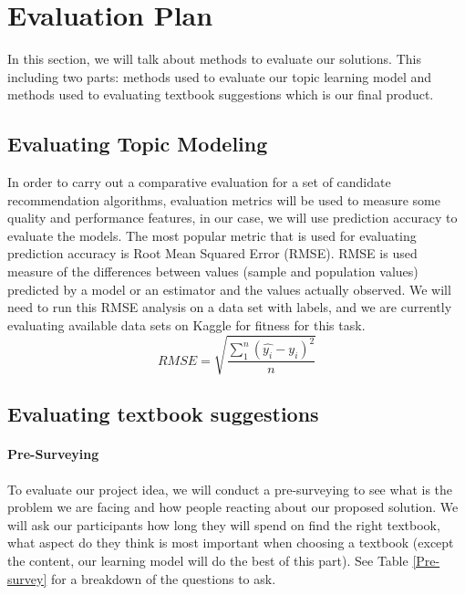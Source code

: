 
\section{Evaluation Plan}
In this section, we will talk about methods to evaluate our solutions. This including two parts: methods used to evaluate our topic learning model and methods used to evaluating textbook suggestions which is our final product. 

\subsection{Evaluating Topic Modeling}
In order to carry out a comparative evaluation for a set of candidate recommendation algorithms, evaluation metrics will be used to measure some quality and performance features, in our case, we will use prediction accuracy to evaluate the models. The most popular metric that is used for evaluating prediction accuracy is Root Mean Squared Error (RMSE). RMSE is used measure of the differences between values (sample and population values) predicted by a model or an estimator and the values actually observed.  We will need to run this RMSE analysis on a data set with labels, and we are currently evaluating available data sets on Kaggle for fitness for this task.  
\newline
\begin{equation}
   RMSE = \sqrt{\frac{\sum_{1}^{n}\left ( \widehat{y_i}-y_i \right )^{2}}{n}}
\end{equation}
   


\subsection{Evaluating textbook suggestions}
\paragraph{Pre-Surveying}
To evaluate our project idea, we will conduct a pre-surveying to see what is the problem we are facing and how people reacting about our proposed solution. We will ask our participants how long they will spend on find the right textbook, what aspect do they think is most important when choosing a textbook (except the content, our learning model will do the best of this part).  See Table \ref{Pre-survey} for a breakdown of the questions to ask.    

